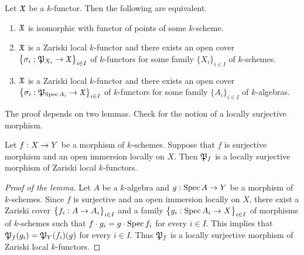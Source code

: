 \begin{theorem}\label{theorem:representabilitybasicresult}
Let ${\mathfrak X}$ be a $k$-functor. Then the following are equivalent.
\begin{enumerate}[label=\emph{\textbf{(\roman*)}}, leftmargin=3.0em]
\item ${\mathfrak X}$ is isomorphic with functor of points of some $k$-scheme.
\item ${\mathfrak X}$ is a Zariski local $k$-functor and there exists an open cover $\big\{\sigma_i:{\mathfrak P}_{X_i}\rightarrow {\mathfrak X}\big\}_{i\in I}$ of $k$-functors for some family $\{X_i\}_{i\in I}$ of $k$-schemes.
\item ${\mathfrak X}$ is a Zariski local $k$-functor and there exists an open cover $\big\{\sigma_i:{\mathfrak P}_{\mathrm{Spec}\, A_i}\rightarrow {\mathfrak X}\big\}_{i\in I}$ of $k$-functors for some family $\{A_i\}_{i\in I}$ of $k$-algebras.
\end{enumerate}
\end{theorem}
\noindent
The proof depends on two lemmas. Check {\cite[Definition 7.1]{Sheaves}} for the notion of a locally surjective morphism.

\begin{lemma}\label{lemma:openimmersionslocallyondomainarezariskilocalkfunctors}
Let $f:X\rightarrow Y$ be a morphism of $k$-schemes. Suppose that $f$ is surjective morphism and an open immersion locally on $X$. Then ${\mathfrak P}_f$ is a locally surjective morphism of Zariski local $k$-functors. 
\end{lemma}
\begin{proof}[Proof of the lemma]
Let $A$ be a $k$-algebra and $g:\mathrm{Spec}\, A\rightarrow Y$ be a morphism of $k$-schemes. Since $f$ is surjective and an open immersion locally on $X$, there exist a Zariski cover $\big\{f_i:A\rightarrow A_i\big\}_{i\in I}$ and a family $\big\{g_i:\mathrm{Spec}\, A_i\rightarrow X\big\}_{i\in I}$ of morphisms of $k$-schemes such that $f\cdot g_i = g\cdot \mathrm{Spec}\, f_i$ for every $i\in I$. This implies that ${\mathfrak P}_f(g_i) = {\mathfrak P}_Y(f_i)(g)$ for every $i\in I$. Thus ${\mathfrak P}_f$ is a locally surjective morphism of Zariski local $k$-functors.
\end{proof}

